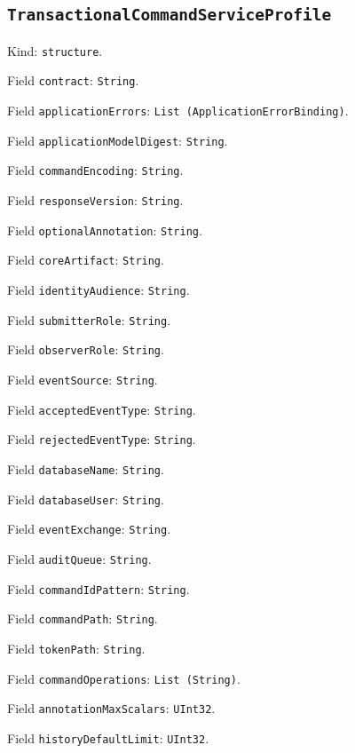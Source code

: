 \documentclass[11pt]{article}
\begin{document}
\subsection*{\texttt{TransactionalCommandServiceProfile}}
\noindent Kind: \texttt{structure}.\par
\noindent Field \texttt{contract}: \texttt{String}.\par
\noindent Field \texttt{applicationErrors}: \texttt{List (ApplicationErrorBinding)}.\par
\noindent Field \texttt{applicationModelDigest}: \texttt{String}.\par
\noindent Field \texttt{commandEncoding}: \texttt{String}.\par
\noindent Field \texttt{responseVersion}: \texttt{String}.\par
\noindent Field \texttt{optionalAnnotation}: \texttt{String}.\par
\noindent Field \texttt{coreArtifact}: \texttt{String}.\par
\noindent Field \texttt{identityAudience}: \texttt{String}.\par
\noindent Field \texttt{submitterRole}: \texttt{String}.\par
\noindent Field \texttt{observerRole}: \texttt{String}.\par
\noindent Field \texttt{eventSource}: \texttt{String}.\par
\noindent Field \texttt{acceptedEventType}: \texttt{String}.\par
\noindent Field \texttt{rejectedEventType}: \texttt{String}.\par
\noindent Field \texttt{databaseName}: \texttt{String}.\par
\noindent Field \texttt{databaseUser}: \texttt{String}.\par
\noindent Field \texttt{eventExchange}: \texttt{String}.\par
\noindent Field \texttt{auditQueue}: \texttt{String}.\par
\noindent Field \texttt{commandIdPattern}: \texttt{String}.\par
\noindent Field \texttt{commandPath}: \texttt{String}.\par
\noindent Field \texttt{tokenPath}: \texttt{String}.\par
\noindent Field \texttt{commandOperations}: \texttt{List (String)}.\par
\noindent Field \texttt{annotationMaxScalars}: \texttt{UInt32}.\par
\noindent Field \texttt{historyDefaultLimit}: \texttt{UInt32}.\par
\end{document}
